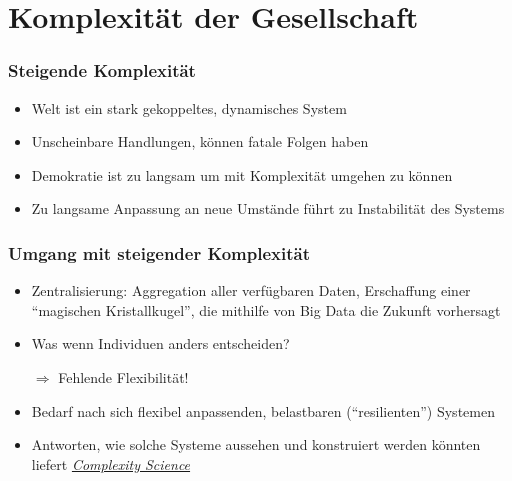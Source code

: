 
\section{Komplexität der Gesellschaft}
\begin{frame}
	\frametitle{Steigende Komplexität}
	\begin{itemize}
		\item
			Welt ist ein stark gekoppeltes, dynamisches System
		\item
			Unscheinbare Handlungen, können fatale Folgen haben
		\item
			Demokratie ist zu langsam um mit Komplexität umgehen zu können
		\item
			Zu langsame Anpassung an neue Umstände führt zu Instabilität des Systems
	\end{itemize}
\end{frame}
\begin{frame}
	\frametitle{Umgang mit steigender Komplexität}
	\begin{itemize}
		\item
			Zentralisierung: 
			Aggregation aller verfügbaren Daten, Erschaffung einer \enquote{magischen Kristallkugel}, die mithilfe von Big Data die Zukunft vorhersagt
		\item
			Was wenn Individuen anders entscheiden?

			$\Rightarrow$ Fehlende Flexibilität!
		\item
			Bedarf nach sich flexibel anpassenden, belastbaren (\enquote{resilienten}) Systemen
		\item
			Antworten, wie solche Systeme aussehen und konstruiert werden könnten liefert \hyperlink{complexity_science}{\textit{Complexity Science}}
	\end{itemize}
\end{frame}

